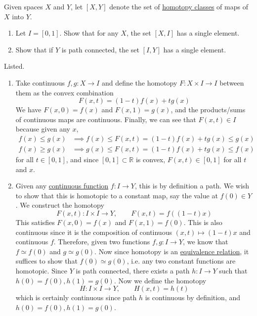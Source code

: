   \begin{exercise}[Munkres 51.2]
    Given spaces $X$ and $Y$, let $[X, Y]$ denote the set of \hyperref[def:homotopy-class]{homotopy classes} of maps of $X$ into $Y$.
    \begin{enumerate}
      \item[(a)] Let $I = [0, 1]$. Show that for any $X$, the set $[X, I]$ has a single element.
      \item[(b)] Show that if $Y$ is path connected, the set $[I, Y]$ has a single element.
    \end{enumerate}
  \end{exercise}
  \begin{solution}
    Listed. 
    \begin{enumerate}
      \item Take continuous $f, g: X \rightarrow I$ and define the homotopy $F: X \times I \rightarrow I$ between them as the convex combination 
      \begin{equation}
        F(x, t) = (1 - t) f(x) + t g(x)
      \end{equation}
      We have $F(x, 0) = f(x)$ and $F(x, 1) = g(x)$, and the products/sums of continuous maps are continuous. Finally, we can see that $F(x, t) \in I$ because given any $x$, 
      \begin{align}
        f(x) \leq g(x) & \implies f(x) \leq F(x, t) = (1 - t) f(x) + t g(x) \leq g(x) \\
        f(x) \geq g(x) & \implies g(x) \leq F(x, t) = (1 - t) f(x) + t g(x) \leq f(x)
      \end{align} 
      for all $t \in [0, 1]$, and since $[0, 1] \subset \mathbb{R}$ is convex, $F(x, t) \in [0, 1]$ for all $t$ and $x$. 

      \item Given any \hyperref[pst-def:continuous_func]{continuous function} $f: I \rightarrow Y$, this is by definition a path. We wish to show that this is homotopic to a constant map, say the value at $f(0) \in Y$. We construct the homotopy 
      \begin{equation}
        F(x, t): I \times I \rightarrow Y, \qquad F(x, t) = f((1 - t) x)
      \end{equation}
      This satisfies $F(x, 0) = f(x)$ and $F(x, 1) = f(0)$. This is also continuous since it is the composition of continuous $(x, t) \mapsto (1 - t)x$ and continuous $f$. Therefore, given two functions $f, g: I \rightarrow Y$, we know that $f \simeq f(0)$ and $g \simeq g(0)$. Now since homotopy is an \hyperref[st-def:equivalence_relation]{equivalence relation}, it suffices to show that $f(0) \simeq g(0)$, i.e. any two constant functions are homotopic. Since $Y$ is path connected, there exists a path $h: I \rightarrow Y$ such that $h(0) = f(0), h(1) = g(0)$. Now we define the homotopy 
      \begin{equation}
        H: I \times I \rightarrow Y, \qquad H(x, t) = h(t)
      \end{equation}
      which is certainly continuous since path $h$ is continuous by definition, and $h(0) = f(0), h(1) = g(0)$. 
    \end{enumerate}
  \end{solution}

